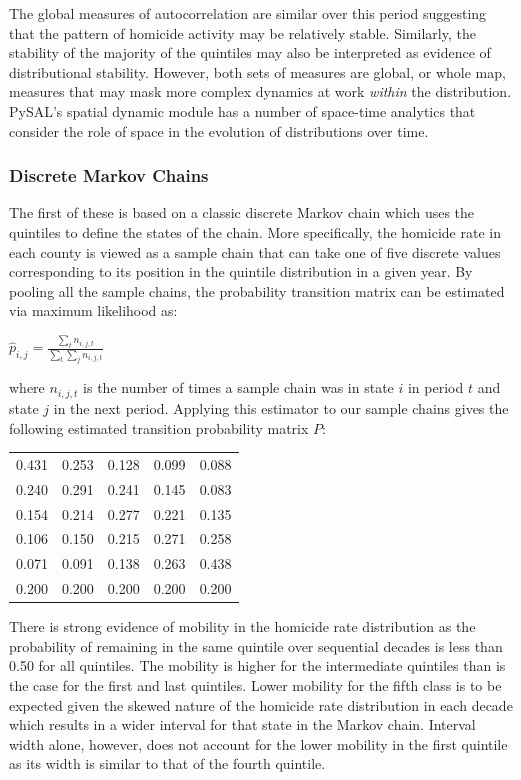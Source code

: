 \documentclass[11pt, titlepage]{article}
\begin{document}
The global measures of autocorrelation are similar over this period
suggesting that the pattern of homicide activity may be relatively
stable. Similarly, the stability of the majority of the quintiles may
also be interpreted as evidence of distributional stability. However,
both sets of measures are global, or whole map, measures that may mask
more complex dynamics at work \emph{within} the distribution. PySAL's
spatial dynamic module has a number of space-time analytics that
consider the role of space in the evolution of distributions over time.

\subsubsection{Discrete Markov Chains}

The first of these is based on a classic discrete Markov chain which
uses the quintiles to define the states of the chain. More specifically,
the homicide rate in each county is viewed as a sample chain that can
take one of five discrete values corresponding to its position in the
quintile distribution in a given year. By pooling all the sample chains,
the probability transition matrix can be estimated via maximum
likelihood as:

$\hat{p}_{i,j} = \frac{\sum_t n_{i,j,t}}{\sum_t \sum_j n_{i,j,t}} $

where $n_{i,j,t}$ is the number of times a sample chain was in state $i$
in period $t$ and state $j$ in the next period. Applying this estimator
to our sample chains gives the following estimated transition
probability matrix $P$:

\begin{tabular}{lllll}\hline
    0.431&0.253&0.128&0.099&0.088\\
    0.240&0.291&0.241&0.145&0.083\\
    0.154&0.214&0.277&0.221&0.135\\
    0.106&0.150&0.215&0.271&0.258\\
    0.071&0.091&0.138&0.263&0.438\\
    \hline
    0.200&0.200&0.200&0.200&0.200\\
    \hline
\end{tabular}

There is strong evidence of mobility in the homicide rate distribution
as the probability of remaining in the same quintile over sequential
decades is less than 0.50 for all quintiles. The mobility is higher for
the intermediate quintiles than is the case for the first and last
quintiles. Lower mobility for the fifth class is to be expected given
the skewed nature of the homicide rate distribution in each decade which
results in a wider interval for that state in the Markov chain. Interval
width alone, however, does not account for the lower mobility in the
first quintile as its width is similar to that of the fourth quintile.
\end{document}
